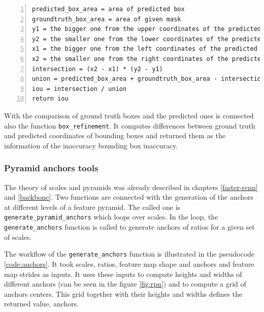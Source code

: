 {\scriptsize
\begin{lstlisting}[style=python, caption={compute\_iou}, captionpos=b, label=code:iou, deletekeywords={from, and},
backgroundcolor = \color{light-gray}, numbers=left, breaklines=true]
predicted_box_area = area of predicted box
groundtruth_box_area = area of given mask
y1 = the bigger one from the upper coordinates of the predicted and ground truth bboxes
y2 = the smaller one from the lower coordinates of the predicted and ground truth bboxes
x1 = the bigger one from the left coordinates of the predicted and ground truth bboxes
x2 = the smaller one from the right coordinates of the predicted and ground truth bboxes
intersection = (x2 - x1) * (y2 - y1)
union = predicted_box_area + groundtruth_box_area - intersection
iou = intersection / union
return iou
\end{lstlisting}}

With the comparison of ground truth boxes and the predicted ones is connected also the function \verb|box_refinement|. It computes differences between ground truth and predicted coordinates of bounding boxes and returned them as the information of the inaccuracy bounding box inaccuracy.


\subsubsection{Pyramid anchors tools}
\label{anchors-func}

The theory of scales and pyramids was already described in chapters \ref{faster-rcnn} and \ref{backbone}. Two functions are connected with the generation of the anchors at different levels of a feature pyramid. The called one is \verb|generate_pyramid_anchors| which loops over scales. In the loop, the \verb|generate_anchors| function is called to generate anchors of ratios for a given set of scales. 

The workflow of the \verb|generate_anchors| function is illustrated in the pseudocode \ref{code:anchors}. It took scales, ratios, feature map shape and anchors and feature map strides as inputs. It uses these inputs to compute heights and widths of different anchors (can be seen in the figure \ref{fig:rpn}) and to compute a grid of anchors centers. This grid together with their heights and widths defines the returned value, anchors.

